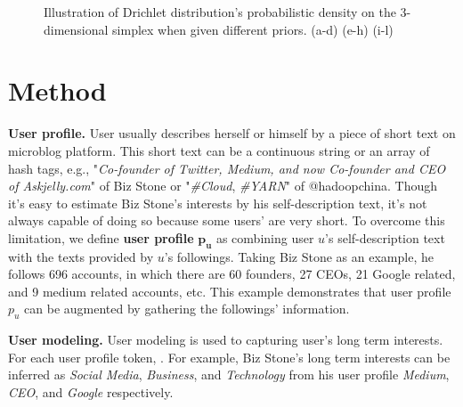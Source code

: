 \documentclass{sig-alternate-05-2015}
\begin{document}
\begin{figure}[ht]
{        }
        \caption{Illustration of Drichlet distribution's probabilistic density on the 3-dimensional simplex when given different priors. (a-d) (e-h) (i-l)}
\end{figure}



\section{Method}
\textbf{User profile.} User usually describes herself or himself by a piece of short text on microblog platform.
This short text can be a continuous string or an array of hash tags, e.g., "\textit{Co-founder of Twitter, Medium, and now Co-founder and CEO of Askjelly.com}" of Biz Stone or "\textit{\#Cloud}, \textit{\#YARN}" of @hadoopchina.
Though it's easy to estimate Biz Stone's interests by his self-description text, it's not always capable of doing so because some users' are very short.
To overcome this limitation, we define \textbf{user profile} \(\bm{p_u}\) as combining user \(u\)'s self-description text with the texts provided by \(u\)'s followings. 
Taking Biz Stone as an example, he follows 696 accounts, in which there are 60 founders, 27 CEOs, 21 Google related, and 9 medium related accounts, etc. 
This example demonstrates that user profile \(p_u\) can be augmented by gathering the followings' information.

\textbf{User modeling.} 
User modeling is used to capturing user's long term interests. 
For each user profile token, .
For example, Biz Stone's long term interests can be inferred as \textit{Social Media}, \textit{Business}, and \textit{Technology} from his user profile \textit{Medium}, \textit{CEO}, and \textit{Google} respectively.
\end{document}
